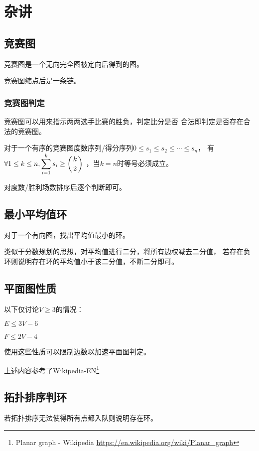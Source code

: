 \section{杂讲}
\subsection{竞赛图}
竞赛图是一个无向完全图被定向后得到的图。
\begin{theorem}
    竞赛图缩点后是一条链。
\end{theorem}
\subsubsection{竞赛图判定}
竞赛图可以用来指示两两选手比赛的胜负，判定比分是否
合法即判定是否存在合法的竞赛图。
\begin{theorem}
对于一个有序的竞赛图度数序列/得分序列$0\leq s_1 \leq s_2 \leq \cdots \leq s_n$，
有$\displaystyle \forall 1\leq k\leq n,\sum_{i=1}^k{s_i}\geq \left(k \atop 2\right)$
，当$k=n$时等号必须成立。
\end{theorem}
对度数/胜利场数排序后逐个判断即可。
\subsection{最小平均值环}
对于一个有向图，找出平均值最小的环。

类似于分数规划的思想，对平均值进行二分，将所有边权减去二分值，
若存在负环则说明存在环的平均值小于该二分值，不断二分即可。
\subsection{平面图性质}
以下仅讨论$V\geq 3$的情况：
\begin{property}
    $E\leq 3V-6$
\end{property}
\begin{property}
    $F\leq 2V-4$
\end{property}
使用这些性质可以限制边数以加速平面图判定。

上述内容参考了Wikipedia-EN\footnote{Planar graph - Wikipedia
    \url{https://en.wikipedia.org/wiki/Planar\_graph}
}
\subsection{拓扑排序判环}
若拓扑排序无法使得所有点都入队则说明存在环。
